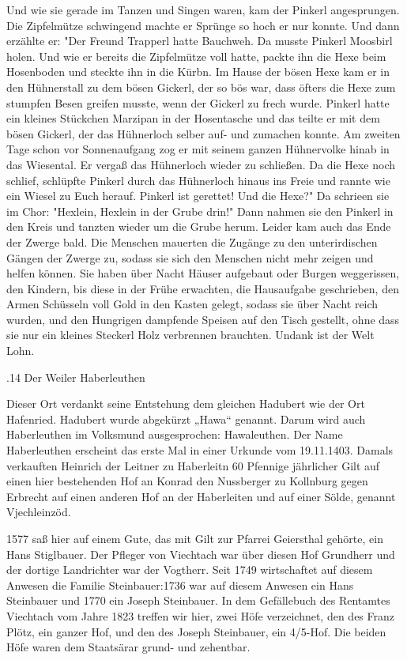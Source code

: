 Und wie sie gerade im Tanzen und Singen waren, kam der Pinkerl angesprungen. Die
Zipfelmütze schwingend machte er Sprünge so hoch er nur konnte. Und dann
erzählte er: "Der Freund Trapperl hatte Bauchweh. Da musste Pinkerl Moosbirl
holen. Und wie er bereits die Zipfelmütze voll hatte, packte ihn die Hexe beim
Hosenboden und steckte ihn in die Kürbn. Im Hause der bösen Hexe kam er in den
Hühnerstall zu dem bösen Gickerl, der so bös war, dass öfters die Hexe zum
stumpfen Besen greifen musste, wenn der Gickerl zu frech wurde. Pinkerl hatte
ein kleines Stückchen Marzipan in der Hosentasche und das teilte er mit dem
bösen Gickerl, der das Hühnerloch selber auf- und zumachen konnte. Am zweiten
Tage schon vor Sonnenaufgang zog er mit seinem ganzen Hühnervolke hinab in das
Wiesental. Er vergaß das Hühnerloch wieder zu schließen. Da die Hexe noch
schlief, schlüpfte Pinkerl durch das Hühnerloch hinaus ins Freie und rannte wie
ein Wiesel zu Euch herauf. Pinkerl ist gerettet! Und die Hexe?" Da schrieen sie
im Chor: "Hexlein, Hexlein in der Grube drin!" Dann nahmen sie den Pinkerl in
den Kreis und tanzten wieder um die Grube herum. Leider kam auch das Ende der
Zwerge bald. Die Menschen mauerten die Zugänge zu den unterirdischen Gängen der
Zwerge zu, sodass sie sich den Menschen nicht mehr zeigen und helfen können. Sie
haben über Nacht Häuser aufgebaut oder Burgen weggerissen, den Kindern, bis
diese in der Frühe erwachten, die Hausaufgabe geschrieben, den Armen Schüsseln
voll Gold in den Kasten gelegt, sodass sie über Nacht reich wurden, und den
Hungrigen dampfende Speisen auf den Tisch gestellt, ohne dass sie nur ein
kleines Steckerl Holz verbrennen brauchten. Undank ist der Welt Lohn.

.14 Der Weiler Haberleuthen

Dieser Ort verdankt seine Entstehung dem gleichen Hadubert wie der Ort
Hafenried. Hadubert wurde abgekürzt „Hawa“ genannt. Darum wird auch Haberleuthen
im Volksmund ausgesprochen: Hawaleuthen. Der Name Haberleuthen erscheint das
erste Mal in einer Urkunde vom 19.11.1403. Damals verkauften Heinrich der
Leitner zu Haberleitn 60 Pfennige jährlicher Gilt auf einen hier bestehenden Hof
an Konrad den Nussberger zu Kollnburg gegen Erbrecht auf einen anderen Hof an
der Haberleiten und auf einer Sölde, genannt Vjechleinzöd.

1577 saß hier auf einem Gute, das mit Gilt zur Pfarrei Geiersthal gehörte, ein
Hans Stiglbauer. Der Pfleger von Viechtach war über diesen Hof Grundherr und der
dortige Landrichter war der Vogtherr. Seit 1749 wirtschaftet auf diesem Anwesen
die Familie Steinbauer:1736 war auf diesem Anwesen ein Hans Steinbauer und 1770
ein Joseph Steinbauer. In dem Gefällebuch des Rentamtes Viechtach vom Jahre 1823
treffen wir hier, zwei Höfe verzeichnet, den des Franz Plötz, ein ganzer Hof,
und den des Joseph Steinbauer, ein 4/5-Hof. Die beiden Höfe waren dem Staatsärar
grund- und zehentbar.

